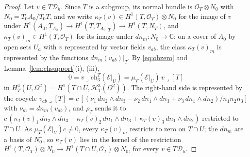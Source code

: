 \documentclass[11pt,reqno]{amsart}
\numberwithin{equation}{section}
\theoremstyle{plain}
\theoremstyle{definition}
\newcommand{\CC}{\mathbb{C}}
\newcommand{\ch}{\mathrm{ch}}
\newcommand{\cD}{\mathcal{D}}
\begin{document}
\begin{proof}
Let $v\in T\cD_{h}$. Since $T$ is a subgroup, its normal bundle is $\mathcal{O}_{T}\otimes N_{0}$ with $N_{0}=T_{0}A_{0}/T_{0}T$, and we write $\kappa_{T}(v)\in H^{1}(T,\mathcal{O}_{T})\otimes N_{0}$ for the image of $v$ under $H^{1}(A_{0},T_{A_{0}})\to H^{1}(T,T_{A_{0}}|_{T})\to H^{1}(T,N_{T})$, and $\kappa_{T}(v)_{m}\in H^{1}(T,\mathcal{O}_{T})$ for its image under $dn_{m}\colon N_{0}\to\CC$; on a cover of $A_{0}$ by open sets $U_{a}$ with $v$ represented by vector fields $v_{ab}$, the class $\kappa_{T}(v)_{m}$ is represented by the functions $dn_{m}(v_{ab})|_{T}$. By \eqref{eq:obzero} and Lemma~\ref{lem:chsupport}(i), (iii),
\[
0=v\lrcorner\ch^{T}_{3}(\mathcal{E}|_{U})=\mu_{T}(\mathcal{E}|_{U})\,v\lrcorner[T]
\]
in $H^{4}_{T}(U,\Omega^{2})=H^{1}(T\cap U,\mathcal{H}^{3}_{T}(\Omega^{2}))$.
The right-hand side is represented by the cocycle $v_{ab}\lrcorner[T]=c\,[(\nu_{1}\,dn_{2}\wedge dn_{3}-\nu_{2}\,dn_{1}\wedge dn_{3}+\nu_{3}\,dn_{1}\wedge dn_{2})/n_{1}n_{2}n_{3}]$ with $\nu_{m}=dn_{m}(v_{ab})$, and $\rho_{T}$ sends it to $c\,(\kappa_{T}(v)_{1}\,dn_{2}\wedge dn_{3}-\kappa_{T}(v)_{2}\,dn_{1}\wedge dn_{3}+\kappa_{T}(v)_{3}\,dn_{1}\wedge dn_{2})$ restricted to $T\cap U$. As $\mu_{T}(\mathcal{E}|_{U})c\ne0$, every $\kappa_{T}(v)_{m}$ restricts to zero on $T\cap U$; the $dn_{m}$ are a basis of $N_{0}^{\vee}$, so $\kappa_{T}(v)$ lies in the kernel of the restriction $H^{1}(T,\mathcal{O}_{T})\otimes N_{0}\to H^{1}(T\cap U,\mathcal{O}_{T})\otimes N_{0}$, for every $v\in T\cD_{h}$.


\end{proof}
\end{document}
